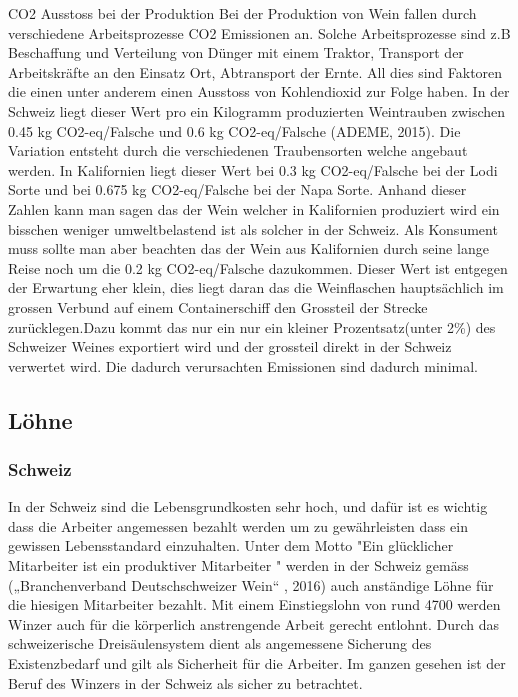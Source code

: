CO2 Ausstoss bei der Produktion
Bei der Produktion von Wein fallen durch verschiedene Arbeitsprozesse CO2 Emissionen an. Solche Arbeitsprozesse sind z.B Beschaffung und Verteilung von Dünger mit einem Traktor, Transport der Arbeitskräfte an den Einsatz Ort, Abtransport der Ernte. All dies sind Faktoren die einen unter anderem einen Ausstoss von Kohlendioxid zur Folge haben. In der Schweiz liegt dieser Wert pro ein Kilogramm produzierten Weintrauben zwischen 0.45 kg CO2-eq/Falsche und 0.6 kg CO2-eq/Falsche (ADEME, 2015). Die Variation entsteht durch die verschiedenen Traubensorten welche angebaut werden. In Kalifornien liegt dieser Wert bei 0.3 kg CO2-eq/Falsche bei der Lodi Sorte und bei 0.675 kg CO2-eq/Falsche bei der Napa Sorte.
Anhand dieser Zahlen kann man sagen das der Wein welcher in Kalifornien produziert wird ein bisschen weniger umweltbelastend ist als solcher in der Schweiz. Als Konsument muss sollte man aber beachten das der Wein aus Kalifornien durch seine lange Reise noch um die 0.2 kg CO2-eq/Falsche dazukommen. Dieser Wert ist entgegen der Erwartung eher klein, dies liegt daran das die Weinflaschen hauptsächlich im grossen Verbund auf einem Containerschiff den Grossteil der Strecke zurücklegen.Dazu kommt das nur ein nur ein kleiner Prozentsatz(unter 2\%) des Schweizer Weines exportiert wird und der grossteil direkt in der Schweiz verwertet wird. Die dadurch verursachten Emissionen sind dadurch minimal. 

\subsection{Löhne}
\subsubsection{Schweiz}
In der Schweiz sind die Lebensgrundkosten sehr hoch, und dafür ist es wichtig dass die Arbeiter angemessen bezahlt werden um zu gewährleisten dass ein gewissen Lebensstandard einzuhalten. Unter dem Motto "Ein glücklicher Mitarbeiter ist ein produktiver Mitarbeiter " werden in der Schweiz gemäss
(„Branchenverband Deutschschweizer Wein“ , 2016) auch anständige Löhne für die hiesigen Mitarbeiter bezahlt. Mit einem Einstiegslohn von rund 4700 werden Winzer auch für die körperlich anstrengende Arbeit gerecht entlohnt. Durch das schweizerische Dreisäulensystem dient als angemessene Sicherung des Existenzbedarf und gilt als Sicherheit für die Arbeiter. Im ganzen gesehen ist der Beruf des Winzers in der Schweiz als sicher zu betrachtet.

